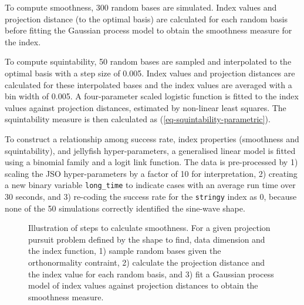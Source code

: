 \documentclass[
  12pt,
]{interact}
\theoremstyle{plain}
\begin{document}
To compute smoothness, 300 random bases are simulated. Index values and
projection distance (to the optimal basis) are calculated for each
random basis before fitting the Gaussian process model to obtain the
smoothness measure for the index.

To compute squintability, 50 random bases are sampled and interpolated
to the optimal basis with a step size of 0.005. Index values and
projection distances are calculated for these interpolated bases and the
index values are averaged with a bin width of 0.005. A four-parameter
scaled logistic function is fitted to the index values against
projection distances, estimated by non-linear least squares. The
squintability measure is then calculated as
(\ref{eq-squintability-parametric}).

To construct a relationship among success rate, index properties
(smoothness and squintability), and jellyfish hyper-parameters, a
generalised linear model is fitted using a binomial family and a logit
link function. The data is pre-processed by 1) scaling the JSO
hyper-parameters by a factor of 10 for interpretation, 2) creating a new
binary variable \texttt{long\_time} to indicate cases with an average
run time over 30 seconds, and 3) re-coding the success rate for the
\texttt{stringy} index as 0, because none of the 50 simulations
correctly identified the sine-wave shape.

\begin{figure}


\caption{\label{fig-smoothness}Illustration of steps to calculate
smoothness. For a given projection pursuit problem defined by the shape
to find, data dimension and the index function, 1) sample random bases
given the orthonormality contraint, 2) calculate the projection distance
and the index value for each random basis, and 3) fit a Gaussian process
model of index values against projection distances to obtain the
smoothness measure.}

\end{figure}%
\end{document}
